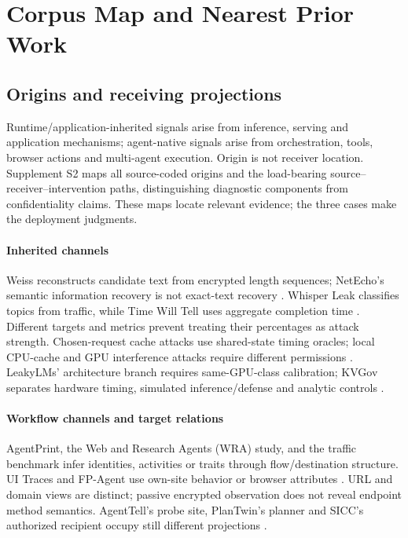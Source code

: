 \section{Corpus Map and Nearest Prior Work}\label{sec:corpus-map}
\subsection{Origins and receiving projections}
Runtime/application-inherited signals arise from inference, serving and application mechanisms; agent-native signals arise from orchestration, tools, browser actions and multi-agent execution. Origin is not receiver location. Supplement S2 maps all source-coded origins and the load-bearing source--receiver--intervention paths, distinguishing diagnostic components from confidentiality claims. These maps locate relevant evidence; the three cases make the deployment judgments.

\paragraph{Inherited channels}
Weiss reconstructs candidate text from encrypted length sequences; NetEcho's semantic information recovery is not exact-text recovery \cite{weiss2024prompt,netecho2025}. Whisper Leak classifies topics from traffic, while Time Will Tell uses aggregate completion time \cite{whisperleak2025,timewilltell2024}. Different targets and metrics prevent treating their percentages as attack strength. Chosen-request cache attacks use shared-state timing oracles; local CPU-cache and GPU interference attacks require different permissions \cite{promptpeek2025,earlybird2025,inputsnatch2024,spliceleak2026,spillbeans2025,gu2026behindbars}. LeakyLMs' architecture branch requires same-GPU-class calibration; KVGov separates hardware timing, simulated inference/defense and analytic controls \cite{majidi2026leakylms,addagada2026kvgov}.

\paragraph{Workflow channels and target relations}
AgentPrint, the Web and Research Agents (WRA) study, and the traffic benchmark infer identities, activities or traits through flow/destination structure. UI Traces and FP-Agent use own-site behavior or browser attributes \cite{agentprint2025,jeong2026wra,pouryousef2026traffic,uitraces2026,wang2026fpagent}. URL and domain views are distinct; passive encrypted observation does not reveal endpoint method semantics. AgentTell's probe site, PlanTwin's planner and SICC's authorized recipient occupy still different projections \cite{shahriar2026agenttell,yu2026plantwin,xu2026sicc}.

